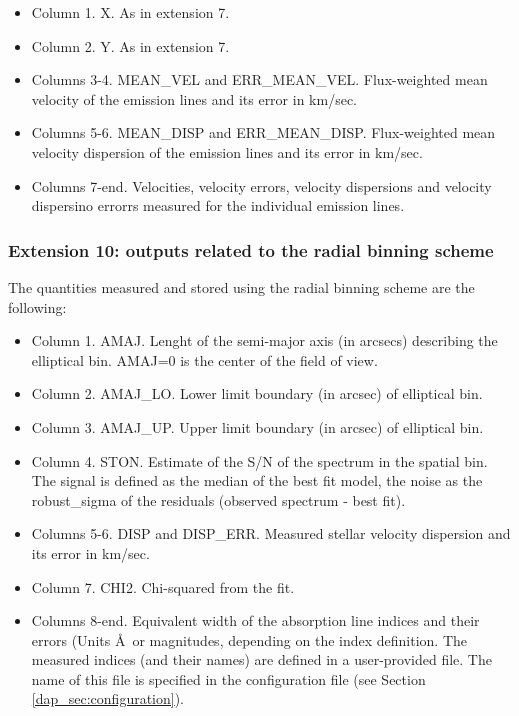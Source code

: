 \begin{itemize}
\item Column 1. X. As in extension 7.
\item Column 2. Y. As in extension 7.
\item Columns 3-4. MEAN\_VEL and ERR\_MEAN\_VEL. Flux-weighted mean velocity of the emission lines and its error in km/sec.
\item Columns 5-6. MEAN\_DISP and ERR\_MEAN\_DISP. Flux-weighted mean velocity dispersion of the emission lines and its error in km/sec.
\item Columns 7-end. Velocities, velocity errors, velocity dispersions and velocity dispersino errorrs measured for the individual emission lines.
\end{itemize}



\subsubsection{Extension 10: outputs related to the radial binning
  scheme} 


The quantities measured and stored using the radial binning scheme are
the following:

\begin{itemize}

\item Column 1. AMAJ. Lenght of the semi-major axis (in arcsecs) describing the elliptical bin. AMAJ=0 is the center of the field of view.
\item Column 2. AMAJ\_LO. Lower limit boundary (in arcsec) of elliptical bin.
\item Column 3. AMAJ\_UP. Upper limit boundary (in arcsec) of elliptical bin.
\item Column 4. STON. Estimate of the S/N of the spectrum in the
  spatial bin. The signal is defined as the median of the best fit
  model, the noise as the robust\_sigma of the residuals (observed
  spectrum - best fit).
\item Columns 5-6.  DISP and DISP\_ERR. Measured stellar velocity dispersion and its error in km/sec.
\item Column 7.  CHI2. Chi-squared from the fit.
\item Columns 8-end. Equivalent width of the absorption line indices
  and their errors (Units \AA\ or magnitudes, depending on the index
  definition. The measured indices (and their names) are defined in a
  user-provided file. The name of this file is specified in the
  configuration file (see Section \ref{dap_sec:configuration}).
\end{itemize}

